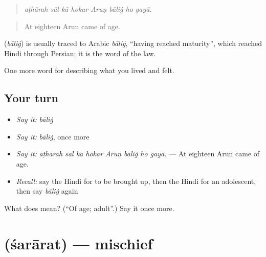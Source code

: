 \begin{quote}
       
\end{quote}

\begin{quote}
\emph{aṭhārah sāl kā hokar Aruṇ bāliġ ho gayā.}
\end{quote}

\begin{quote}
At eighteen Arun came of age.
\end{quote}

\begin{cousinweb}
\textbf{} (\emph{bāliġ}) is usually traced to Arabic \emph{bāliġ}, \textquotedblleft{}having reached maturity\textquotedblright{}, which reached Hindi through Persian; it is the word of the law.
\end{cousinweb}

\begin{grammarlens}[title={What you've built}]
One more word for describing what you lived and felt.
\end{grammarlens}

\subsection*{Your turn}
\begin{itemize}
\raggedright
  \item \emph{Say it:} \emph{bāliġ}
  \item \emph{Say it:} \emph{bāliġ}, once more
  \item \emph{Say it:} \emph{aṭhārah sāl kā hokar Aruṇ bāliġ ho gayā.} — At eighteen Arun came of age.
  \item \emph{Recall:} say the Hindi for to be brought up, then the Hindi for an adolescent, then say \emph{bāliġ} again
\end{itemize}

\begin{tcolorbox}[breakable,colback=teal!4,colframe=teal!35!black,title={Before you move on}]
What does  mean? (\textquotedblleft{}Of age; adult\textquotedblright{}.) Say it once more.
\end{tcolorbox}
\section[\texorpdfstring{\hi{शरारत} (śarārat)}{शरारत (śarārat)}]{ (śarārat) — mischief}


